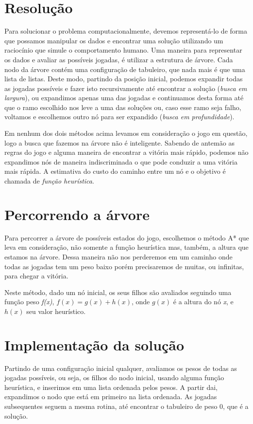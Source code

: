 \documentclass[a4paper,11pt]{article}
\begin{document}
\section{Resolução}
Para solucionar o problema computacionalmente, devemos representá-lo de forma
que possamos manipular os dados e encontrar uma solução utilizando um raciocínio
que simule o comportamento humano. Uma maneira para representar os dados e
avaliar as possíveis jogadas, é utilizar a estrutura de árvore. Cada nodo da árvore contém uma configuração de tabuleiro, 
que nada mais é que uma lista de listas.
Deste modo, partindo da posição inicial, podemos expandir todas as jogadas possíveis e fazer
isto recursivamente até encontrar a solução ({\it busca em largura}), ou
expandimos apenas uma das jogadas e continuamos desta forma até que o ramo
escolhido nos leve a uma das soluções ou, caso esse ramo seja falho, voltamos e
escolhemos outro nó para ser expandido ({\it busca em profundidade}).

Em nenhum dos dois métodos acima levamos em consideração o jogo em questão, logo
a busca que fazemos na árvore não é inteligente. Sabendo de antemão as regras do
jogo e alguma maneira de encontrar a vitória mais rápido, podemos não expandimos
nós de maneira indiscriminada o que pode conduzir a uma vitória mais rápida. A
estimativa do custo do caminho entre um nó e o objetivo é chamada de {\it função
  heurística}.

\section{Percorrendo a árvore}
Para percorrer a árvore de possíveis estados do jogo, escolhemos o método A* que
leva em consideração, não somente a função heurística mas, também, a altura que
estamos na árvore. Dessa maneira não nos perderemos em um caminho onde todas as
jogadas tem um peso baixo porém precisaremos de muitas, ou infinitas, para chegar
a vitória. 

Neste método, dado um nó inicial, os seus filhos são avaliados seguindo uma
função peso {\it f(x)}, $ f(x) = g(x) + h(x) $, onde $ g(x) $ é a altura do nó
{\it x}, e $h(x)$ seu valor heurístico.


\section{Implementação da solução}
Partindo de uma configuração inicial qualquer, avaliamos os pesos de todas as
jogadas possíveis, ou seja, os filhos do nodo inicial, usando alguma função heurística, e inserimos em uma lista ordenada pelos
pesos. A partir dai, expandimos o nodo que está em primeiro na lista ordenada.
As jogadas subsequentes seguem a mesma rotina, até encontrar o tabuleiro de peso 0, que é a solução.
\end{document}
